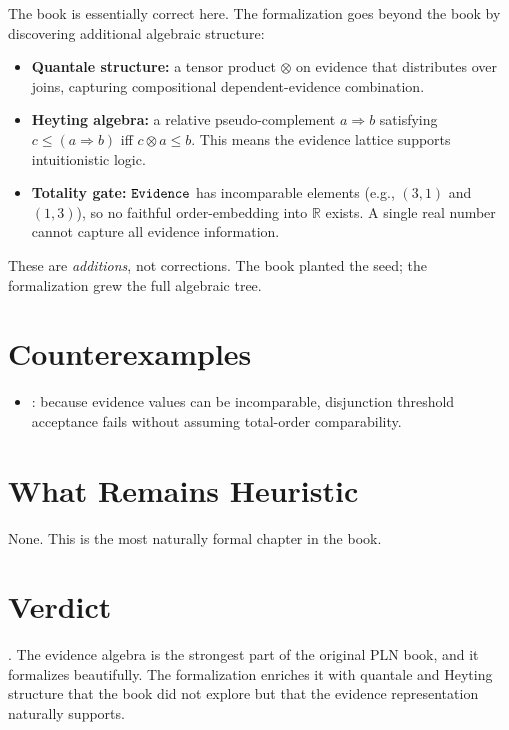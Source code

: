 \documentclass[11pt,openany]{report}
\begin{document}
The book is essentially correct here.  The formalization goes beyond
the book by discovering additional algebraic structure:
\begin{itemize}
\item \textbf{Quantale structure:} a tensor product $\otimes$ on evidence
  that distributes over joins, capturing compositional dependent-evidence
  combination.
\item \textbf{Heyting algebra:} a relative pseudo-complement
  $a \Rightarrow b$ satisfying $c \le (a \Rightarrow b)$ iff $c \otimes a \le b$.
  This means the evidence lattice supports intuitionistic logic.
\item \textbf{Totality gate:} $\mathtt{Evidence}$ has incomparable elements
  (e.g., $(3,1)$ and $(1,3)$), so no faithful order-embedding into $\mathbb{R}$
  exists.  A single real number cannot capture all evidence information.
\end{itemize}

These are \emph{additions}, not corrections.  The book planted the seed;
the formalization grew the full algebraic tree.

\section{Counterexamples}

\begin{itemize}
\item {}: because evidence values can be
  incomparable, disjunction threshold acceptance fails without assuming
  total-order comparability.
\end{itemize}

\section{What Remains Heuristic}

None.  This is the most naturally formal chapter in the book.

\section{Verdict}

\verdictClean{}.  The evidence algebra is the strongest part of the
original PLN book, and it formalizes beautifully.  The formalization
enriches it with quantale and Heyting structure that the book did not
explore but that the evidence representation naturally supports.
\end{document}
